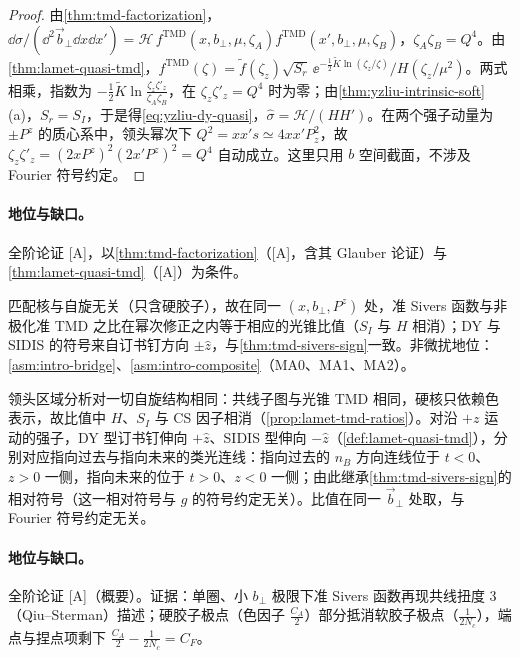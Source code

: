 \begin{proof}
由\cref{thm:tmd-factorization}，$\dd\sigma/(\dd^2\vec b_\perp\dd x\dd x')=\mathcal H\,f^{\mathrm{TMD}}(x,b_\perp,\mu,\zeta_A)f^{\mathrm{TMD}}(x',b_\perp,\mu,\zeta_B)$，$\zeta_A\zeta_B=Q^4$。由\cref{thm:lamet-quasi-tmd}，$f^{\mathrm{TMD}}(\zeta)=\tilde f(\zeta_z)\sqrt{S_r}\,\ee^{-\frac12\tilde K\ln(\zeta_z/\zeta)}/H(\zeta_z/\mu^2)$。两式相乘，指数为 $-\frac12\tilde K\ln\frac{\zeta_z\zeta'_z}{\zeta_A\zeta_B}$，在 $\zeta_z\zeta'_z=Q^4$ 时为零；由\cref{thm:yzliu-intrinsic-soft}(a)，$S_r=S_I$，于是得\cref{eq:yzliu-dy-quasi}，$\hat\sigma=\mathcal H/(HH')$。在两个强子动量为 $\pm P^z$ 的质心系中，领头幂次下 $Q^2=xx's\simeq4xx'P_z^2$，故 $\zeta_z\zeta'_z=(2xP^z)^2(2x'P^z)^2=Q^4$ 自动成立。这里只用 $b$ 空间截面，不涉及 Fourier 符号约定。
\end{proof}

\paragraph{地位与缺口。}全阶论证 [A]，以\cref{thm:tmd-factorization}（[A]，含其 Glauber 论证）与\cref{thm:lamet-quasi-tmd}（[A]）为条件\cite[式~(22)]{Ji:2019sxk}\cite[式~(27)]{Ji:2019ewn}\cite[式~(155)]{Liu:2022nnk}。

\begin{proposition}\label{prop:yzliu-sivers}
匹配核与自旋无关（只含硬胶子），故在同一 $(x,b_\perp,P^z)$ 处，准 Sivers 函数与非极化准 TMD 之比在幂次修正之内等于相应的光锥比值（$S_I$ 与 $H$ 相消）；DY 与 SIDIS 的符号来自订书钉方向 $\pm\hat z$，与\cref{thm:tmd-sivers-sign}一致。非微扰地位：\cref{asm:intro-bridge}、\cref{asm:intro-composite}（MA0、MA1、MA2）。
\end{proposition}

\begin{proofsketch}
领头区域分析对一切自旋结构相同\cite[第~I--II~节]{Ji:2020jeb}：共线子图与光锥 TMD 相同，硬核只依赖色表示，故比值中 $H$、$S_I$ 与 CS 因子相消（\cref{prop:lamet-tmd-ratios}）。对沿 $+z$ 运动的强子，DY 型订书钉伸向 $+\hat z$、SIDIS 型伸向 $-\hat z$（\cref{def:lamet-quasi-tmd}），分别对应指向过去与指向未来的类光连线：指向过去的 $n_B$ 方向连线位于 $t<0$、$z>0$ 一侧，指向未来的位于 $t>0$、$z<0$ 一侧；由此继承\cref{thm:tmd-sivers-sign}的相对符号（这一相对符号与 $g$ 的符号约定无关）。比值在同一 $\vec b_\perp$ 处取，与 Fourier 符号约定无关。
\end{proofsketch}

\paragraph{地位与缺口。}全阶论证 [A]（概要）。证据：单圈、小 $b_\perp$ 极限下准 Sivers 函数再现共线扭度 3（Qiu--Sterman）描述；硬胶子极点（色因子 $\frac{C_A}2$）部分抵消软胶子极点（$\frac1{2N_c}$），端点与捏点项剩下 $\frac{C_A}2-\frac1{2N_c}=C_F$\cite[第~III~节]{Ji:2020jeb}。
